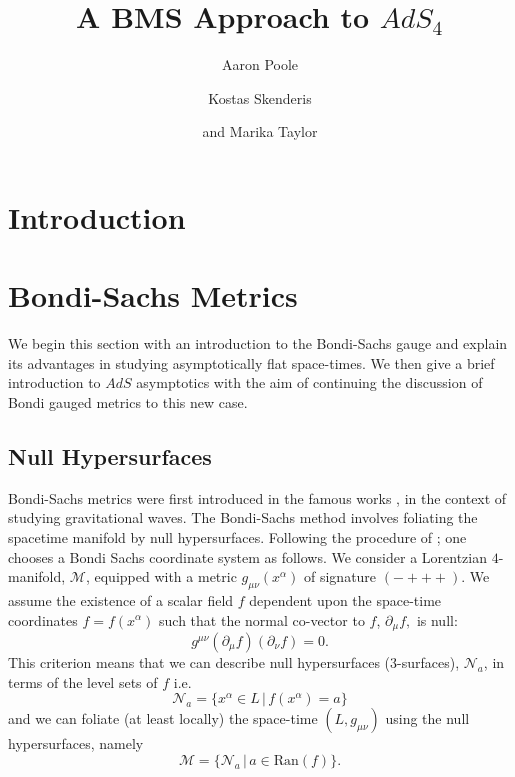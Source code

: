 \documentclass[a4paper,11pt]{article}
\title{A BMS Approach to $AdS_4$}
\author{Aaron Poole}
\author{Kostas Skenderis}
\author{ and Marika Taylor}
\affiliation{Mathematical Sciences and STAG Research Centre, University of Southampton \\
Highfield, Southampton SO17 1BJ, United Kingdom.}
\numberwithin{equation}{section}
\begin{document}
\maketitle
\flushbottom


\section{Introduction}


\section{Bondi-Sachs Metrics} \label{sec: Bondi-Sachs_metrics}


We begin this section with an introduction to the Bondi-Sachs gauge and explain its advantages in studying asymptotically flat space-times. We then give a brief introduction to $AdS$ asymptotics with the aim of continuing the discussion of Bondi gauged metrics to this new case.

\subsection{Null Hypersurfaces}

Bondi-Sachs metrics were first introduced in the famous works \cite{Bondi:1962px, Sachs:1962wk}, in the context of studying gravitational waves. The Bondi-Sachs method involves foliating the spacetime manifold by null hypersurfaces. Following the procedure of \cite{Sachs:1962wk}; one chooses a Bondi Sachs coordinate system as follows. We consider a Lorentzian $4$-manifold, $\mathcal{M}$, equipped with a metric $g_{\mu \nu}(x^{\alpha})$ of signature $(-+++)$. We assume the existence of a scalar field $f$ dependent upon the space-time coordinates $f=f(x^{\alpha})$ such that the normal co-vector to $f$, $\partial_{\mu} f,$ is null: 
\begin{equation}
g^{\mu \nu}( \partial_{\mu} f)( \partial_{\nu} f)=0.
\end{equation} 
This criterion means that we can describe null hypersurfaces (3-surfaces), $\mathcal{N}_a$, in terms of the level sets of $f$ i.e. 
\begin{equation}
\mathcal{N}_a=\{x^{\alpha} \in L \, | \, f(x^{\alpha})=a\} 
\end{equation} 
and we can foliate (at least locally) the space-time $(L, g_{\mu \nu})$ using the null hypersurfaces, namely
\begin{equation}
\mathcal{M}=\{\mathcal{N}_a \, | \, a \in \text{Ran}(f)\}.
\end{equation}
\end{document}
